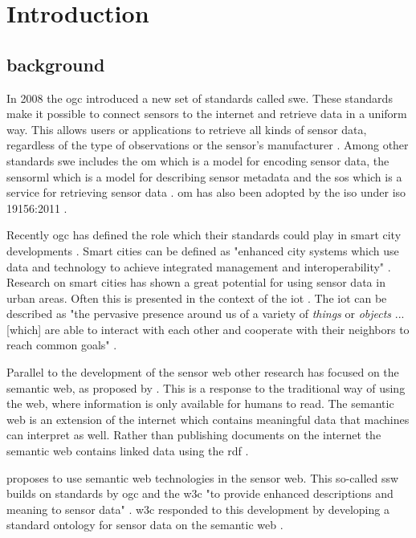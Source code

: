 
\chapter{Introduction}
\label{chap:introduction}

\section{background}
In 2008 the \ac{ogc} introduced a new set of standards called \ac{swe}. These standards make it possible to connect sensors to the internet and retrieve data in a uniform way. This allows users or applications to retrieve all kinds of sensor data, regardless of the type of observations or the sensor's manufacturer \citep{SW:Botts}. Among other standards \ac{swe} includes the \ac{om} which is a model for encoding sensor data, the \ac{sensorml} which is a model for describing sensor metadata and the \ac{sos} which is a service for retrieving sensor data \citep{SW:OGC}. \ac{om} has also been adopted by the \ac{iso} under \ac{iso} 19156:2011 \cite{SW:ISO}. 

Recently \ac{ogc} has defined the role which their standards could play in smart city developments \citep{SC:OGC}. Smart cities can be defined as "enhanced city systems which use data and technology to achieve integrated management and interoperability" \citep[p. 18]{SC:Moir}. Research on smart cities has shown a great potential for using sensor data in urban areas. Often this is presented in the context of the \ac{iot} \citep{IOT:Zanelli, SSW:Perera}. The \ac{iot} can be described as "the pervasive presence around us of a variety of \textit{things} or \textit{objects} ... [which] are able to interact with each other and cooperate with their neighbors to reach common goals" \cite[p. 2787]{IOT:Atzori}. 

Parallel to the development of the sensor web other research has focused on the semantic web, as proposed by \cite{LD:Berners-lee}. This is a response to the traditional way of using the web, where information is only available for humans to read. The semantic web is an extension of the internet which contains meaningful data that machines can interpret as well. Rather than publishing documents on the internet the semantic web contains linked data using the \ac{rdf} \citep{LD:Bizer}.    

\cite{SSW:Sheth} proposes to use semantic web technologies in the sensor web. This so-called \ac{ssw} builds on standards by \ac{ogc} and the \ac{w3c} "to provide enhanced descriptions and meaning to sensor data" \cite[p.78]{SSW:Sheth}. \ac{w3c} responded to this development by developing a standard ontology for sensor data on the semantic web \citep{SSW:SSN_incubatorGroup}. \\
 
